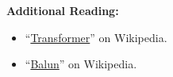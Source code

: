 
{\bf Additional Reading:}
\begin{itemize}
\item ``\href{https://en.wikipedia.org/wiki/Transformer}{Transformer}'' on Wikipedia.
\item ``\href{https://en.wikipedia.org/wiki/Balun}{Balun}'' on Wikipedia.
\end{itemize}

